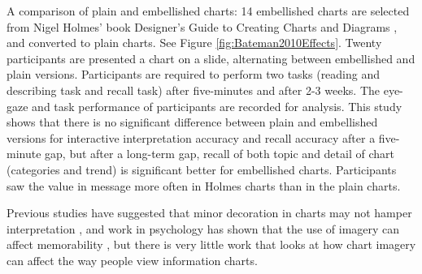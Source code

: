 \documentclass{egpubl}
\begin{document}
A comparison of plain and embellished charts: 14 embellished charts are selected from Nigel Holmes' book Designer's Guide to Creating 
Charts and Diagrams \cite{holmes}, and converted to plain charts. See Figure \ref{fig:Bateman2010Effects}. Twenty participants are presented a chart on a slide, alternating between embellished and plain versions. Participants are required to perform two tasks (reading and describing task and recall task) after five-minutes and after 2-3 weeks. The eye-gaze and task performance of participants are recorded for analysis. This study shows that there is no significant difference between plain and embellished versions for interactive interpretation accuracy and recall accuracy after a five-minute gap,
but after a long-term gap, recall of both topic and detail of chart (categories and trend) is significant better for embellished charts. Participants saw the value in message more often in Holmes charts than in the plain charts.

Previous studies have suggested that minor decoration in charts may not hamper interpretation \cite{Blasio}, and work in psychology has shown that the use of imagery can affect memorability \cite{gambrell}, but there is very little work that looks at how chart imagery can affect the way people view information charts. 
\end{document}
